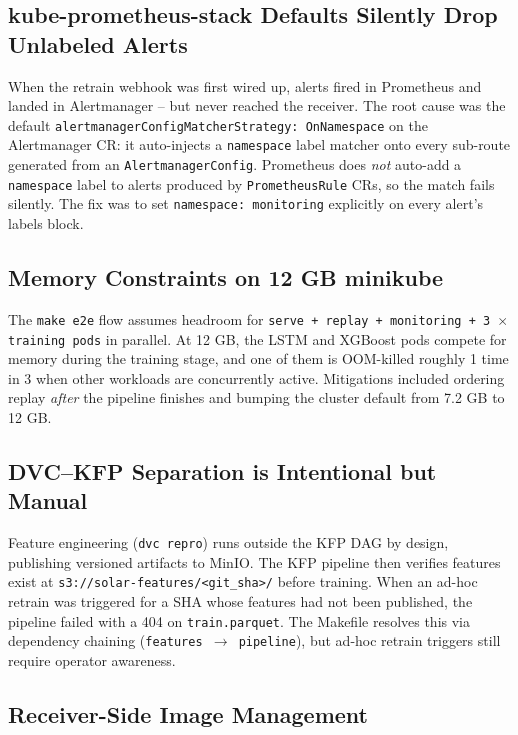 \documentclass[11pt,a4paper]{article}
\begin{document}
\subsection{kube-prometheus-stack Defaults Silently Drop Unlabeled Alerts}

When the retrain webhook was first wired up, alerts fired in Prometheus and landed in Alertmanager -- but never reached the receiver. The root cause was the default \texttt{alertmanagerConfigMatcherStrategy: OnNamespace} on the Alertmanager CR: it auto-injects a \texttt{namespace} label matcher onto every sub-route generated from an \texttt{AlertmanagerConfig}. Prometheus does \emph{not} auto-add a \texttt{namespace} label to alerts produced by \texttt{PrometheusRule} CRs, so the match fails silently. The fix was to set \texttt{namespace: monitoring} explicitly on every alert's labels block.

\subsection{Memory Constraints on 12 GB minikube}

The \texttt{make e2e} flow assumes headroom for \texttt{serve + replay + monitoring + 3 $\times$ training pods} in parallel. At 12 GB, the LSTM and XGBoost pods compete for memory during the training stage, and one of them is OOM-killed roughly 1 time in 3 when other workloads are concurrently active. Mitigations included ordering replay \emph{after} the pipeline finishes and bumping the cluster default from 7.2 GB to 12 GB.

\subsection{DVC--KFP Separation is Intentional but Manual}

Feature engineering (\texttt{dvc repro}) runs outside the KFP DAG by design, publishing versioned artifacts to MinIO. The KFP pipeline then verifies features exist at \texttt{s3://solar-features/<git\_sha>/} before training. When an ad-hoc retrain was triggered for a SHA whose features had not been published, the pipeline failed with a 404 on \texttt{train.parquet}. The Makefile resolves this via dependency chaining (\texttt{features $\rightarrow$ pipeline}), but ad-hoc retrain triggers still require operator awareness.

\subsection{Receiver-Side Image Management}
\end{document}
